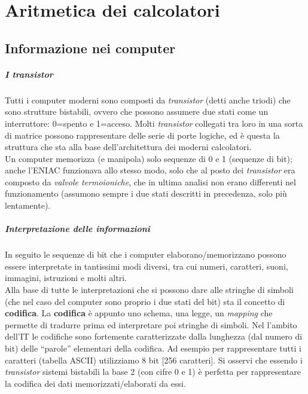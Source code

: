 \chapter{Aritmetica dei calcolatori}

\section{Informazione nei computer}
\paragraph*{I transistor} Tutti i computer moderni sono composti da \textit{transistor} (detti anche triodi) che sono strutture bistabili, ovvero che possono assumere due stati come un interruttore: 0=spento e 1=acceso. Molti \textit{transistor} collegati tra loro in una sorta di matrice possono rappresentare delle serie di porte logiche, ed è questa la struttura che sta alla base dell'architettura dei moderni calcolatori.\\ 
Un computer memorizza (e manipola) solo sequenze di 0 e 1 (sequenze di bit); anche l’ENIAC funzionava allo stesso modo, solo che al posto dei \textit{transistor} era composto da \textit{valvole termoioniche}, che in ultima analisi non erano differenti nel funzionamento (assumono sempre i due stati descritti in precedenza, solo più lentamente).
\paragraph*{Interpretazione delle informazioni} In seguito le sequenze di bit che i computer elaborano/memorizzano possono essere interpretate in tantissimi modi diversi, tra cui numeri, caratteri, suoni, immagini, istruzioni e molti altri.\\
Alla base di tutte le interpretazioni che si possono dare alle stringhe di simboli (che nel caso del computer sono proprio i due stati del bit) sta il concetto di \textbf{codifica}. La \textbf{codifica} è appunto uno schema, una legge, un \textit{mapping} che permette di tradurre prima ed interpretare poi stringhe di simboli.
Nel l’ambito dell’IT le codifiche sono fortemente caratterizzate dalla lunghezza (dal numero di bit) delle “parole” elementari della codifica. Ad esempio per rappresentare tutti i caratteri (tabella ASCII) utilizziamo  8 bit [256 caratteri].
Si osservi che essendo i \textit{transistor} sistemi bistabili la base 2 (con cifre 0 e 1) è perfetta per rappresentare la codifica dei dati memorizzati/elaborati da essi.
